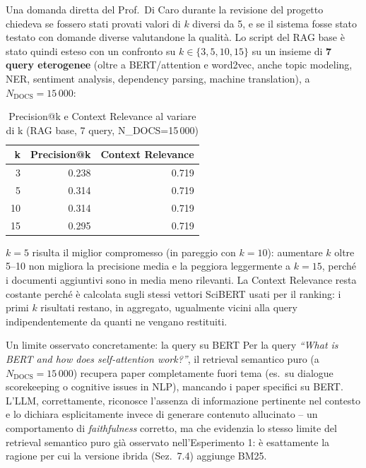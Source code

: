 \documentclass[12pt,a4paper]{article}
\begin{document}
Una domanda diretta del Prof.\ Di Caro durante la revisione del progetto chiedeva se fossero stati provati valori di $k$ diversi da 5, e se il sistema fosse stato testato con domande diverse valutandone la qualit\`a. Lo script del RAG base \`e stato quindi esteso con un confronto su $k \in \{3, 5, 10, 15\}$ su un insieme di \textbf{7 query eterogenee} (oltre a BERT/attention e word2vec, anche topic modeling, NER, sentiment analysis, dependency parsing, machine translation), a $N_{\text{DOCS}}=15\,000$:

\begin{table}[H]
  \centering
  \caption{Precision@k e Context Relevance al variare di k (RAG base, 7 query, N\_DOCS=15\,000)}
  \begin{tabular}{rrr}
    \toprule
    \textbf{k} & \textbf{Precision@k} & \textbf{Context Relevance} \\
    \midrule
    3  & 0.238 & 0.719 \\
    5  & 0.314 & 0.719 \\
    10 & 0.314 & 0.719 \\
    15 & 0.295 & 0.719 \\
    \bottomrule
  \end{tabular}
\end{table}

$k=5$ risulta il miglior compromesso (in pareggio con $k=10$): aumentare $k$ oltre 5--10 non migliora la precisione media e la peggiora leggermente a $k=15$, perch\'e i documenti aggiuntivi sono in media meno rilevanti. La Context Relevance resta costante perch\'e \`e calcolata sugli stessi vettori SciBERT usati per il ranking: i primi $k$ risultati restano, in aggregato, ugualmente vicini alla query indipendentemente da quanti ne vengano restituiti.

\begin{warnbox}{Un limite osservato concretamente: la query su BERT}
Per la query \textit{``What is BERT and how does self-attention work?''}, il retrieval semantico puro (a $N_{\text{DOCS}}=15\,000$) recupera paper completamente fuori tema (es.\ su dialogue scorekeeping o cognitive issues in NLP), mancando i paper specifici su BERT. L'LLM, correttamente, riconosce l'assenza di informazione pertinente nel contesto e lo dichiara esplicitamente invece di generare contenuto allucinato -- un comportamento di \emph{faithfulness} corretto, ma che evidenzia lo stesso limite del retrieval semantico puro gi\`a osservato nell'Esperimento 1: \`e esattamente la ragione per cui la versione ibrida (Sez.~7.4) aggiunge BM25.
\end{warnbox}
\end{document}
